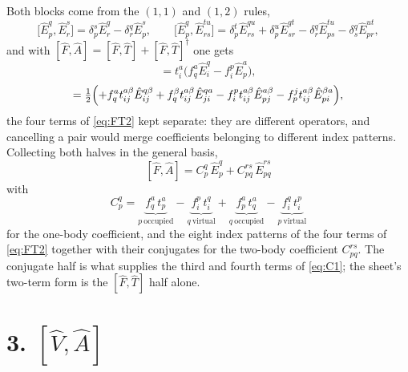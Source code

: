 \documentclass[11pt]{article}
\newcommand{\E}[2]{\hat E^{#1}_{#2}}
\newcommand{\occ}{i}
\newcommand{\vir}{a}
\begin{document}
Both blocks come from the $(1,1)$ and $(1,2)$ rules,
\begin{equation}
  \bigl[\E{q}{p},\E{s}{r}\bigr]=\delta^s_p\E{q}{r}-\delta^q_r\E{s}{p},
  \qquad
  \bigl[\E{q}{p},\E{tu}{rs}\bigr]
   =\delta^t_p\E{qu}{rs}+\delta^u_p\E{qt}{sr}
    -\delta^q_r\E{tu}{ps}-\delta^q_s\E{ut}{pr},
  \label{eq:rules}
\end{equation}
and with $[\hat F,\hat A]=[\hat F,\hat T]+[\hat F,\hat T]^\dagger$ one gets
\begin{equation}
  [\hat F,\hat T_1]=t^\vir_\occ\bigl(f^\vir_q\E{q}{\occ}-f^p_\occ\E{\vir}{p}\bigr),
  \label{eq:FT1}
\end{equation}
\begin{equation}
  [\hat F,\hat T_2]=\tfrac12\Bigl(
   +f^\vir_q t^{\vir\beta}_{\occ j}\E{q\beta}{\occ j}
   +f^\beta_q t^{\vir\beta}_{\occ j}\E{q\vir}{j\occ}
   -f^p_\occ t^{\vir\beta}_{\occ j}\E{\vir\beta}{pj}
   -f^j_p t^{\vir\beta}_{\occ j}\E{\beta\vir}{p\occ}\Bigr),
  \label{eq:FT2}
\end{equation}
the four terms of \eqref{eq:FT2} kept separate: they are different operators,
and cancelling a pair would merge coefficients belonging to different index
patterns. Collecting both halves in the general basis,
\begin{equation}
  \boxed{\;[\hat F,\hat A]=C^q_p\,\E{q}{p}+C^{rs}_{pq}\,\E{rs}{pq}\;}
  \label{eq:FA}
\end{equation}
with
\begin{equation}
  \boxed{\;C^q_p=
    \underbrace{f^\vir_q\,t^\vir_p}_{p\ \text{occupied}}
   -\underbrace{f^p_\occ\,t^q_\occ}_{q\ \text{virtual}}
   +\underbrace{f^\vir_p\,t^\vir_q}_{q\ \text{occupied}}
   -\underbrace{f^q_\occ\,t^p_\occ}_{p\ \text{virtual}}\;}
  \label{eq:C1}
\end{equation}
for the one-body coefficient, and the eight index patterns of the four terms of
\eqref{eq:FT2} together with their conjugates for the two-body coefficient
$C^{rs}_{pq}$. The conjugate half is what supplies the third and fourth terms of
\eqref{eq:C1}; the sheet's two-term form is the $[\hat F,\hat T]$ half alone.

\section*{3. \texorpdfstring{$[\hat V,\hat A]$}{[V,A]}}
\end{document}
